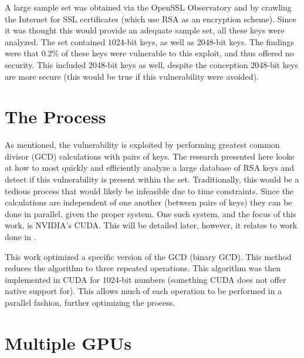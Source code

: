 \documentclass[12pt]{ucthesis}
\begin{document}
A large sample set was obtained via the OpenSSL Observatory and by crawling the
Internet for SSL certificates (which use RSA as an encryption scheme). Since it
was thought this would provide an adequate sample set, all these keys were
analyzed. The set contained 1024-bit keys, as well as 2048-bit keys. The
findings were that 0.2\% of these keys were vulnerable to this exploit, and
thus offered no security. This included 2048-bit keys as well, despite the
conception 2048-bit keys are more secure (this would be true if this
vulnerability were avoided).

\section{The Process}
\label{subsec:process}
As mentioned, the vulnerability is exploited by performing greatest common
divisor (GCD) calculations with pairs of keys. The research presented here
looks at how to most quickly and efficiently analyze a large database of
RSA keys and detect if this vulnerability is present within the set.
Traditionally, this would be a tedious process that would likely be infeasible
due to time constraints. Since the calculations are independent of one another
(between pairs of keys) they can be done in parallel, given the proper system.
One such system, and the focus of this work, is NVIDIA's CUDA. This will be
detailed later, however, it relates to work done in \cite{fujimoto2009high}. 

This work optimized a specific version of the GCD (binary GCD). This method
reduces the algorithm to three repeated operations. This algorithm was then
implemented in CUDA for 1024-bit numbers (something CUDA does not offer native
support for). This allows much of each operation to be performed in a parallel
fashion, further optimizing the process.

\section{Multiple GPUs}
\label{subsec:muliGPU}
%
\end{document}
